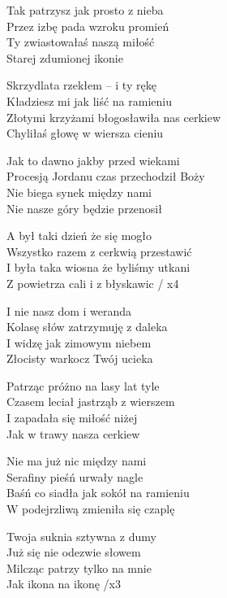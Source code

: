 \begin{text}
    Tak patrzysz jak prosto z nieba\\
    Przez izbę pada wzroku promień\\
    Ty zwiastowałaś naszą miłość\\
    Starej zdumionej ikonie

    Skrzydlata rzekłem – i ty rękę\\
    Kładziesz mi jak liść na ramieniu\\
    Złotymi krzyżami błogosławiła nas cerkiew\\
    Chyliłaś głowę w wiersza cieniu

    \vin Jak to dawno jakby przed wiekami\\
    \vin Procesją Jordanu czas przechodził Boży\\
    \vin Nie biega synek między nami\\
    \vin Nie nasze góry będzie przenosił

    \vin A był taki dzień że się mogło\\
    \vin Wszystko razem z cerkwią przestawić\\
    \vin I była taka wiosna że byliśmy utkani\\
    \vin Z powietrza cali i z błyskawic / x4

    I nie nasz dom i weranda\\
    Kolasę słów zatrzymuję z daleka\\
    I widzę jak zimowym niebem\\
    Złocisty warkocz Twój ucieka

    Patrząc próżno na lasy lat tyle\\
    Czasem leciał jastrząb z wierszem\\
    I zapadała się miłość niżej\\
    Jak w trawy nasza cerkiew

    Nie ma już nic między nami\\
    Serafiny pieśń urwały nagle\\
    Baśń co siadła jak sokół na ramieniu\\
    W podejrzliwą zmieniła się czaplę

    Twoja suknia sztywna z dumy\\
    Już się nie odezwie słowem\\
    Milcząc patrzy tylko na mnie\\
    Jak ikona na ikonę /x3
\end{text}
